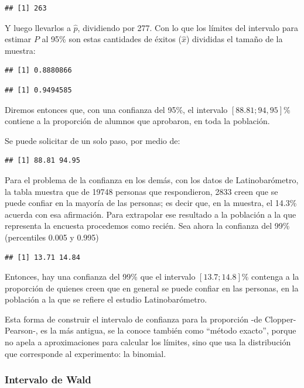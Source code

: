 \documentclass[]{book}
\begin{document}
\begin{verbatim}
## [1] 263
\end{verbatim}

Y luego llevarlos a \(\widehat{p}\), dividiendo por 277. Con lo que los límites del intervalo para estimar \(P\) al 95\% son estas cantidades de éxitos (\(\widehat{x}\)) divididas el tamaño de la muestra:

\begin{verbatim}
## [1] 0.8880866
\end{verbatim}

\begin{verbatim}
## [1] 0.9494585
\end{verbatim}

Diremos entonces que, con una confianza del 95\%, el intervalo \([88.81; 94,95]\)\% contiene a la proporción de alumnos que aprobaron, en toda la
población.

Se puede solicitar de un solo paso, por medio de:

\begin{verbatim}
## [1] 88.81 94.95
\end{verbatim}

Para el problema de la confianza en los demás, con los datos de Latinobarómetro, la tabla muestra que de 19748 personas que respondieron, 2833 creen que se puede confiar en la mayoría de las personas; es decir que, en la muestra, el 14.3\% acuerda con esa afirmación. Para extrapolar ese resultado a la población a la que representa la encuesta procedemos como recién. Sea ahora la confianza del 99\% (percentiles 0.005 y 0.995)

\begin{verbatim}
## [1] 13.71 14.84
\end{verbatim}

Entonces, hay una confianza del 99\% que el intervalo \([13.7; 14.8]\)\% contenga a la proporción de quienes creen que en general se puede confiar en las personas, en la población a la que se refiere el estudio Latinobarómetro.

Esta forma de construir el intervalo de confianza para la proporción -de Clopper-Pearson-, es la más antigua, se la conoce también como ``método exacto'', porque no apela a aproximaciones para calcular los límites, sino que usa la distribución que corresponde al experimento: la binomial.

\hypertarget{intervalo-de-wald}{%
\subsubsection{Intervalo de Wald}\label{intervalo-de-wald}}
\end{document}
